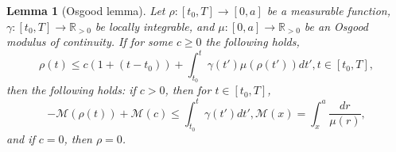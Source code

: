 \documentclass[12pt]{article}
\newtheorem{lemma}{Lemma}
\begin{document}
\begin{lemma}[Osgood lemma] \label{Osgood} %
Let $\rho: [t_0, T] \rightarrow [0, a]$ be a measurable function, $\gamma : [t_0, T] \rightarrow \mathbb{R}_{>0}$ be locally integrable, and $\mu: [0, a] \rightarrow \mathbb{R}_{>0}$ be an Osgood modulus of continuity. If for some $c \ge 0$ the following holds,
\begin{equation}
\rho(t) \le c (1+(t- t_0) ) + \int_{t_0} ^t \gamma (t') \mu (\rho(t') ) dt', t \in [t_0, T],
\end{equation}
then the following holds: if $c>0$, then for $t \in [t_0, T]$, 
\begin{equation}
-\mathcal{M} (\rho(t) ) + \mathcal{M} (c) \le \int_{t_0 } ^t \gamma(t') dt', \mathcal{M} (x) = \int_x ^a \frac{dr}{\mu(r) },
\end{equation}
and if $c=0$, then $\rho = 0$. 
\end{lemma}
\end{document}
